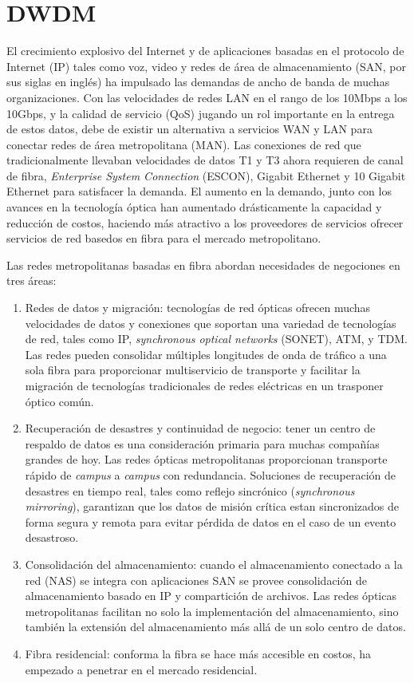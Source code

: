 \documentclass[10pt,journal,compsoc]{IEEEtran}
\begin{document}
\section{DWDM}
El crecimiento explosivo del Internet y de aplicaciones basadas en el protocolo de Internet (IP) tales como voz, video y redes de área de almacenamiento (SAN, por sus siglas en inglés) ha impulsado las demandas de ancho de banda de muchas organizaciones. Con las velocidades de redes LAN en el rango de los 10Mbps a los 10Gbps, y la calidad de servicio (QoS) jugando un rol importante en la entrega de estos datos, debe de existir un alternativa a servicios WAN y LAN para conectar redes de área metropolitana (MAN). Las conexiones de red que tradicionalmente llevaban velocidades de datos \textsc{T1} y \textsc{T3} ahora requieren de canal de fibra, \emph{Enterprise System Connection} (ESCON), Gigabit Ethernet y 10 Gigabit Ethernet para satisfacer la demanda. El aumento en la demando, junto con los avances en la tecnología óptica han aumentado drásticamente la capacidad y reducción de costos, haciendo más atractivo a los proveedores de servicios ofrecer servicios de red basedos en fibra para el mercado metropolitano. 

Las redes metropolitanas basadas en fibra abordan necesidades de negociones en tres áreas:
\begin{enumerate}
    \item Redes de datos y migración: tecnologías de red ópticas ofrecen muchas velocidades de datos y conexiones que soportan una variedad de tecnologías de red, tales como IP, \emph{synchronous optical networks} (SONET), ATM, y TDM. Las redes pueden consolidar múltiples longitudes de onda de tráfico a una sola fibra para proporcionar multiservicio de transporte y facilitar la migración de tecnologías tradicionales de redes eléctricas en un trasponer óptico común.
    \item Recuperación de desastres y continuidad de negocio: tener un centro de respaldo de datos es una consideración primaria para muchas compañías grandes de hoy. Las redes ópticas metropolitanas proporcionan transporte rápido de \emph{campus} a \emph{campus} con redundancia. Soluciones de recuperación de desastres en tiempo real, tales como reflejo sincrónico (\emph{synchronous mirroring}), garantizan que los datos de misión crítica estan sincronizados de forma segura y remota para evitar pérdida de datos en el caso de un evento desastroso.
    \item Consolidación del almacenamiento: cuando el almacenamiento conectado a la red (NAS) se integra con aplicaciones SAN se provee consolidación de almacenamiento basado en IP y compartición de archivos. Las redes ópticas metropolitanas facilitan no solo la implementación del almacenamiento, sino también la extensión del almacenamiento más allá de un solo centro de datos. 
   \item Fibra residencial: conforma la fibra se hace más accesible en costos, ha empezado a penetrar en el mercado residencial.
\end{enumerate}
\end{document}
